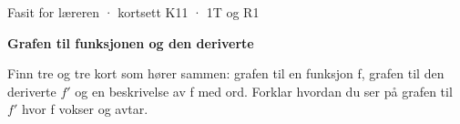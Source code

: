\documentclass[11pt,a4paper]{article}
\begin{document}
\begin{minipage}[t]{0.8\linewidth}\vspace{0pt}
{\sffamily\small\color{dempet}Fasit for læreren · kortsett K11 · 1T og R1}\par\vspace{0.25em}
{\fontsize{20}{24}\selectfont\bfseries Grafen til funksjonen og den deriverte}\par\vspace{0.5em}
Finn tre og tre kort som hører sammen: grafen til en funksjon f, grafen til den deriverte $f'$ og en beskrivelse av f med ord. Forklar hvordan du ser på grafen til $f'$ hvor f vokser og avtar.\par{}
\end{minipage}\hfill
\begin{minipage}[t]{0.15\linewidth}\vspace{0pt}\raggedleft
{}
\end{minipage}\par\vspace{0.8em}
\end{document}
